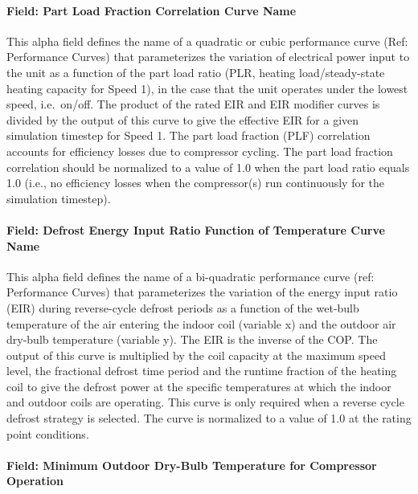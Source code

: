 \paragraph{Field: Part Load Fraction Correlation Curve Name}\label{field-part-load-fraction-correlation-curve-name-7}

This alpha field defines the name of a quadratic or cubic performance curve (Ref: Performance Curves) that parameterizes the variation of electrical power input to the unit as a function of the part load ratio (PLR, heating load/steady-state heating capacity for Speed 1), in the case that the unit operates under the lowest speed, i.e.~on/off. The product of the rated EIR and EIR modifier curves is divided by the output of this curve to give the effective EIR for a given simulation timestep for Speed 1. The part load fraction (PLF) correlation accounts for efficiency losses due to compressor cycling. The part load fraction correlation should be normalized to a value of 1.0 when the part load ratio equals 1.0 (i.e., no efficiency losses when the compressor(s) run continuously for the simulation timestep).

\paragraph{Field: Defrost Energy Input Ratio Function of Temperature Curve Name}\label{field-defrost-energy-input-ratio-function-of-temperature-curve-name-2}

This alpha field defines the name of a bi-quadratic performance curve (ref: Performance Curves) that parameterizes the variation of the energy input ratio (EIR) during reverse-cycle defrost periods as a function of the wet-bulb temperature of the air entering the indoor coil (variable x) and the outdoor air dry-bulb temperature (variable y). The EIR is the inverse of the COP. The output of this curve is multiplied by the coil capacity at the maximum speed level, the fractional defrost time period and the runtime fraction of the heating coil to give the defrost power at the specific temperatures at which the indoor and outdoor coils are operating. This curve is only required when a reverse cycle defrost strategy is selected. The curve is normalized to a value of 1.0 at the rating point conditions.

\paragraph{Field: Minimum Outdoor Dry-Bulb Temperature for Compressor Operation}\label{field-minimum-outdoor-dry-bulb-temperature-for-compressor-operation-2}

